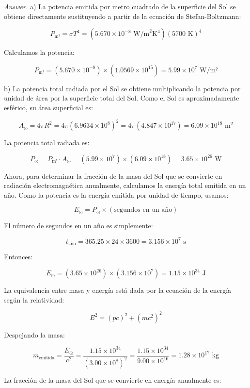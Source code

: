\documentclass{elsarticle}
\begin{document}
\color{purple}\textit{Answer.}\color{black} a) La potencia emitida por metro cuadrado de la superficie del Sol se obtiene directamente sustituyendo a partir de la ecuación de Stefan-Boltzmann:

\[
P_{\text{m²}} = \sigma T^4  = (5.670 \times 10^{-8} \text{ W/m}^2\text{K}^4) (5700 \text{ K})^4
\]

Calculamos la potencia:

\[
P_{\text{m²}} = (5.670 \times 10^{-8}) \times (1.0569 \times 10^{15}) = 5.99 \times 10^7 \text{ W/m²}
\]

b) La potencia total radiada por el Sol se obtiene multiplicando la potencia por unidad de área por la superficie total del Sol. Como el Sol es aproximadamente esférico, su área superficial es:

\[
A_{\odot} = 4\pi R^2 = 4\pi (6.9634 \times 10^8)^2 = 4\pi (4.847 \times 10^{17}) = 6.09 \times 10^{18} \text{ m}^2
\]

La potencia total radiada es:

\[
P_{\odot} = P_{\text{m²}} \cdot A_{\odot} = (5.99 \times 10^7) \times (6.09 \times 10^{18}) = 3.65 \times 10^{26} \text{ W}
\]

Ahora, para determinar la fracción de la masa del Sol que se convierte en radiación electromagnética anualmente, calculamos la energía total emitida en un año. Como la potencia es la energía emitida por unidad de tiempo, usamos:

\[
E_{\odot} = P_{\odot} \times (\text{segundos en un año})
\]

El número de segundos en un año es simplemente:

\[
t_{\text{año}} = 365.25 \times 24 \times 3600 = 3.156 \times 10^7 \text{ s}
\]

Entonces:

\[
E_{\odot} = (3.65 \times 10^{26}) \times (3.156 \times 10^7) = 1.15 \times 10^{34} \text{ J}
\]

La equivalencia entre masa y energía está dada por la ecuación de la energía según la relatividad:

\[
E^2 = (pc)^2+(mc^2)^2
\]

Despejando la masa:

\[
m_{\text{emitida}} = \frac{E_{\odot}}{c^2} = \frac{1.15 \times 10^{34}}{(3.00 \times 10^8)^2} = \frac{1.15 \times 10^{34}}{9.00 \times 10^{16}} = 1.28 \times 10^{17} \text{ kg}
\]

La fracción de la masa del Sol que se convierte en energía anualmente es:
\end{document}
